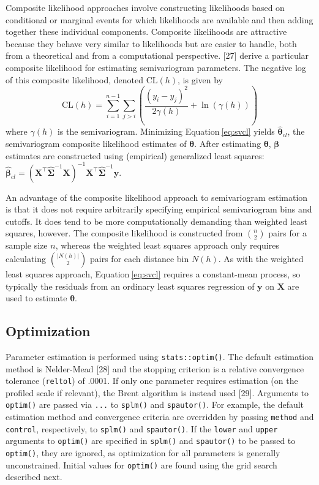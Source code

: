 \documentclass[10pt,letterpaper]{article}
\begin{document}
Composite likelihood approaches involve constructing likelihoods based
on conditional or marginal events for which likelihoods are available
and then adding together these individual components. Composite
likelihoods are attractive because they behave very similar to
likelihoods but are easier to handle, both from a theoretical and from a
computational perspective. {[}27{]} derive a particular composite
likelihood for estimating semivariogram parameters. The negative log of
this composite likelihood, denoted \(\text{CL}(h)\), is given by
\begin{equation}\label{eq:svcl}
  \text{CL}(h) = \sum_{i = 1}^{n - 1} \sum_{j > i} \left( \frac{(y_i - y_j)^2}{2\gamma(h)} + \ln(\gamma(h)) \right)
\end{equation} where \(\gamma(h)\) is the semivariogram. Minimizing
Equation\(~\)\ref{eq:svcl} yields \(\boldsymbol{\hat{\theta}}_{cl}\),
the semivariogram composite likelihood estimates of
\(\boldsymbol{\theta}\). After estimating \(\boldsymbol{\theta}\),
\(\boldsymbol{\beta}\) estimates are constructed using (empirical)
generalized least squares:
\(\boldsymbol{\hat{\beta}}_{cl} = (\mathbf{X}^\top \hat{\mathbf{\Sigma}}^{-1} \mathbf{X})^{-1} \mathbf{X}^\top \hat{\mathbf{\Sigma}}^{-1} \mathbf{y}\).

An advantage of the composite likelihood approach to semivariogram
estimation is that it does not require arbitrarily specifying empirical
semivariogram bins and cutoffs. It does tend to be more computationally
demanding than weighted least squares, however. The composite likelihood
is constructed from \(\binom{n}{2}\) pairs for a sample size \(n\),
whereas the weighted least squares approach only requires calculating
\(\binom{|N(h)|}{2}\) pairs for each distance bin \(N(h)\). As with the
weighted least squares approach, Equation\(~\)\ref{eq:svcl} requires a
constant-mean process, so typically the residuals from an ordinary least
squares regression of \(\mathbf{y}\) on \(\mathbf{X}\) are used to
estimate \(\boldsymbol{\theta}\).

\hypertarget{optimization}{%
\subsection{Optimization}\label{optimization}}

Parameter estimation is performed using \texttt{stats::optim()}. The
default estimation method is Nelder-Mead {[}28{]} and the stopping
criterion is a relative convergence tolerance (\texttt{reltol}) of
.0001. If only one parameter requires estimation (on the profiled scale
if relevant), the Brent algorithm is instead used {[}29{]}. Arguments to
\texttt{optim()} are passed via \texttt{...} to \texttt{splm()} and
\texttt{spautor()}. For example, the default estimation method and
convergence criteria are overridden by passing \texttt{method} and
\texttt{control}, respectively, to \texttt{splm()} and
\texttt{spautor()}. If the \texttt{lower} and \texttt{upper} arguments
to \texttt{optim()} are specified in \texttt{splm()} and
\texttt{spautor()} to be passed to \texttt{optim()}, they are ignored,
as optimization for all parameters is generally unconstrained. Initial
values for \texttt{optim()} are found using the grid search described
next.
\end{document}
